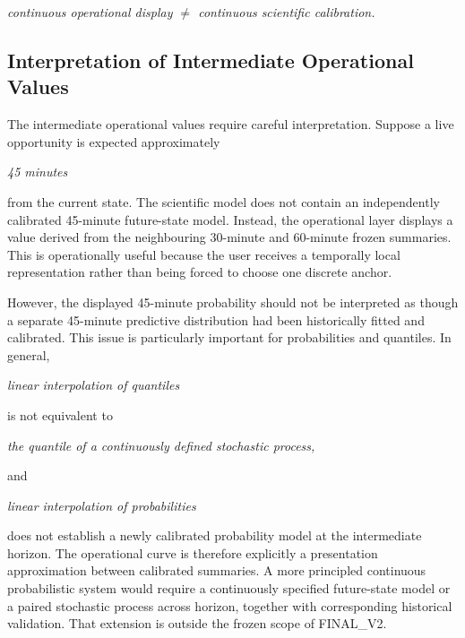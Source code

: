 \begin{center}\textit{continuous operational display \ensuremath{\neq} continuous scientific calibration.}\end{center}

\subsection{Interpretation of Intermediate Operational Values}
The intermediate operational values require careful interpretation. Suppose a live opportunity is expected approximately

\begin{center}\textit{45 minutes}\end{center}

from the current state. The scientific model does not contain an independently calibrated 45-minute future-state model. Instead, the operational layer displays a value derived from the neighbouring 30-minute and 60-minute frozen summaries. This is operationally useful because the user receives a temporally local representation rather than being forced to choose one discrete anchor.

However, the displayed 45-minute probability should not be interpreted as though a separate 45-minute predictive distribution had been historically fitted and calibrated. This issue is particularly important for probabilities and quantiles. In general,

\begin{center}\textit{linear interpolation of quantiles}\end{center}

is not equivalent to

\begin{center}\textit{the quantile of a continuously defined stochastic process,}\end{center}

and

\begin{center}\textit{linear interpolation of probabilities}\end{center}

does not establish a newly calibrated probability model at the intermediate horizon. The operational curve is therefore explicitly a presentation approximation between calibrated summaries. A more principled continuous probabilistic system would require a continuously specified future-state model or a paired stochastic process across horizon, together with corresponding historical validation. That extension is outside the frozen scope of FINAL\_V2.


